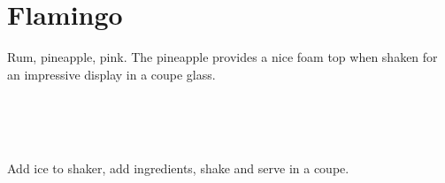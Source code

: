 \section[Flamingo]{Flamingo~\vegan}


\begin{recipestats}[
	servings=1,
	preptime=5 \minute,
	source=Mike \& Jane,
	original=\citefield{bonnevilleCocktailCollectionRumIII}{shorttitle}\cite{bonnevilleCocktailCollectionRumIII},
]
\end{recipestats}


\begin{recipeabstract}
	Rum, pineapple, pink.
	The pineapple provides a nice foam top when shaken for an impressive display in a coupe glass.
\end{recipeabstract}


\begin{ingredientcolumns}[1]
	\begin{ingredientblock}
		\\
		\\
		\\
	\end{ingredientblock}
\end{ingredientcolumns}


\begin{preparation}
\item Add ice to shaker, add ingredients, shake and serve in a coupe.
\end{preparation}


\recipeend
